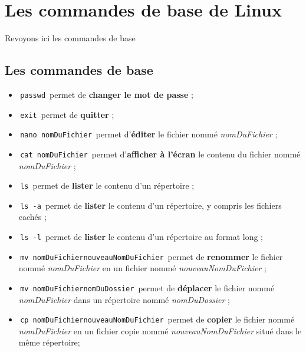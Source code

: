 \documentclass[11pt,a4paper]{article}
\begin{document}
            \section{Les commandes de base de Linux}Revoyons ici les commandes de base\subsection{Les commandes de base}
					\begin{itemize}
				
			\item \,\verb|passwd|\, permet de \textbf{changer le mot de passe } ; 
        
			\item \,\verb|exit|\, permet de \textbf{quitter} ; 
        
			\item \,\verb|nano nomDuFichier|\, 
          permet d'\textbf{\'editer} le fichier 
          nomm\'e \textit{nomDuFichier} ; 
        
			\item \,\verb|cat nomDuFichier|\, 
          permet d'\textbf{afficher \`a l'\'ecran} le contenu du fichier 
          nomm\'e \textit{nomDuFichier} ; 
        
			\item \,\verb|ls|\, permet de \textbf{lister} le contenu d'un r\'epertoire ; 
        
			\item \,\verb|ls -a|\, permet de \textbf{lister} le contenu d'un r\'epertoire, y compris les fichiers cach\'es ; 
        
			\item \,\verb|ls -l|\, permet de \textbf{lister} le contenu d'un r\'epertoire au format long ; 
        
			\item \,\verb|mv nomDuFichiernouveauNomDuFichier|\, 
          permet de \textbf{renommer} le fichier nomm\'e \textit{nomDuFichier}
          en un fichier nomm\'e \textit{nouveauNomDuFichier} ; 
        
			\item \,\verb|mv nomDuFichiernomDuDossier|\, 
          permet de \textbf{d\'eplacer} le fichier nomm\'e \textit{nomDuFichier}
          dans un r\'epertoire nomm\'e \textit{nomDuDossier} ; 
        
			\item \,\verb|cp nomDuFichiernouveauNomDuFichier|\, 
          permet de \textbf{copier} le fichier nomm\'e \textit{nomDuFichier}
          en un fichier copie  nomm\'e \textit{nouveauNomDuFichier} situ\'e dans le m\^eme r\'epertoire; 
        

\end{itemize}
\end{document}
